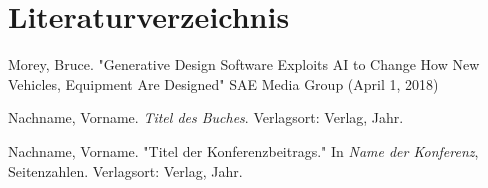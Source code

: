 \section*{Literaturverzeichnis}
\begin{thebibliography}{99}
 Morey, Bruce. "Generative Design Software Exploits AI to Change How New Vehicles, Equipment Are Designed" SAE Media Group (April 1, 2018)

 Nachname, Vorname. \textit{Titel des Buches}. Verlagsort: Verlag, Jahr.

 Nachname, Vorname. "Titel der Konferenzbeitrags." In \textit{Name der Konferenz}, Seitenzahlen. Verlagsort: Verlag, Jahr.


\end{thebibliography}